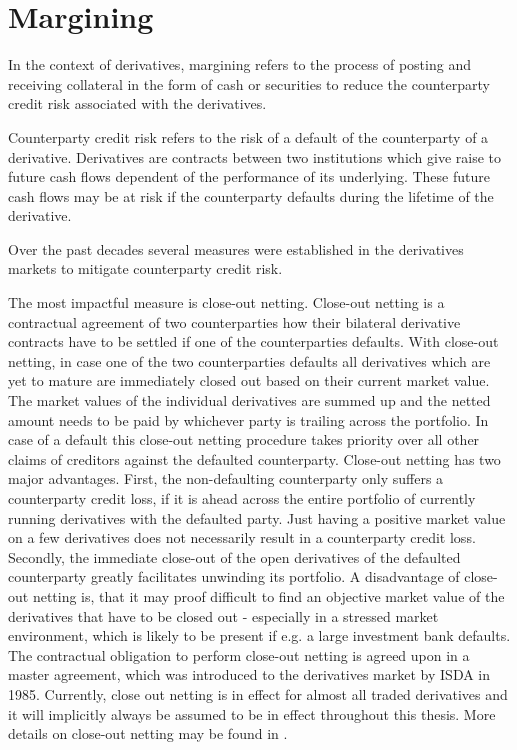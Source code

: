\documentclass[../Thesis_AHoecherl.tex]{subfiles}
\begin{document}
\section{Margining}\label{Margining}

In the context of derivatives, margining refers to the process of posting and receiving collateral in the form of cash or securities to reduce the counterparty credit risk associated with the derivatives.

Counterparty credit risk refers to the risk of a default of the counterparty of a derivative. Derivatives are contracts between two institutions which give raise to future cash flows dependent of the performance of its underlying. These future cash flows may be at risk if the counterparty defaults during the lifetime of the derivative. 

Over the past decades several measures were established in the derivatives markets to mitigate counterparty credit risk.

The most impactful measure is close-out netting. Close-out netting is a contractual agreement of two counterparties how their bilateral derivative contracts have to be settled if one of the counterparties defaults. With close-out netting, in case one of the two counterparties defaults all derivatives which are yet to mature are immediately closed out based on their current market value. The market values of the individual derivatives are summed up and the netted amount needs to be paid by whichever party is trailing across the portfolio. In case of a default this close-out netting procedure takes priority over all other claims of creditors against the defaulted counterparty. Close-out netting has two major advantages. First, the non-defaulting counterparty only suffers a counterparty credit loss, if it is ahead across the entire portfolio of currently running derivatives with the defaulted party. Just having a positive market value on a few derivatives does not necessarily result in a counterparty credit loss. Secondly, the immediate close-out of the open derivatives of the defaulted counterparty greatly facilitates unwinding its portfolio. A disadvantage of close-out netting is, that it may proof difficult to find an objective market value of the derivatives that have to be closed out - especially in a stressed market environment, which is likely to be present if e.g. a large investment bank defaults. The contractual obligation to perform close-out netting is agreed upon in a master agreement, which was introduced to the derivatives market by \gls{ISDA} in 1985. Currently, close out netting is in effect for almost all traded derivatives and it will implicitly always be assumed to be in effect throughout this thesis. More details on close-out netting may be found in \cite[Chapter~5]{gregory2015xva}.
\end{document}
